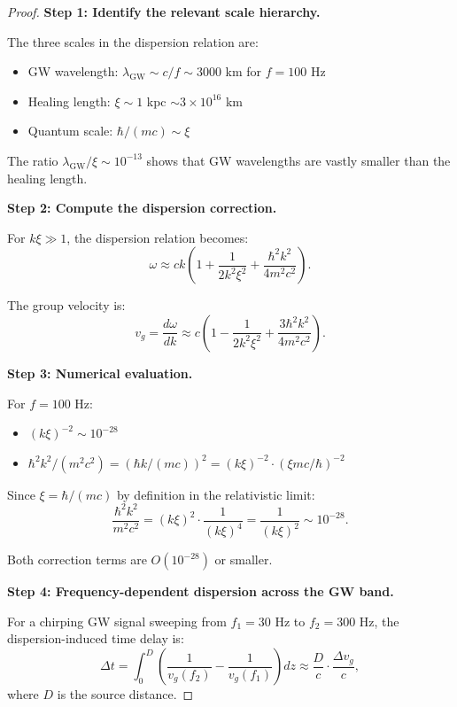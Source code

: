 \documentclass[11pt,a4paper]{article}
\theoremstyle{definition}
\theoremstyle{remark}
\begin{document}
\begin{proof}
\textbf{Step 1: Identify the relevant scale hierarchy.}

The three scales in the dispersion relation are:
\begin{itemize}
\item GW wavelength: $\lambda_{\mathrm{GW}} \sim c/f \sim 3000$ km for $f = 100$ Hz
\item Healing length: $\xi \sim 1$ kpc $\sim 3 \times 10^{16}$ km
\item Quantum scale: $\hbar/(mc) \sim \xi$
\end{itemize}

The ratio $\lambda_{\mathrm{GW}}/\xi \sim 10^{-13}$ shows that GW wavelengths are vastly smaller than the healing length.

\textbf{Step 2: Compute the dispersion correction.}

For $k\xi \gg 1$, the dispersion relation becomes:
\begin{equation}
\omega \approx ck\left(1 + \frac{1}{2k^2\xi^2} + \frac{\hbar^2 k^2}{4m^2 c^2}\right).
\end{equation}

The group velocity is:
\begin{equation}
v_g = \frac{d\omega}{dk} \approx c\left(1 - \frac{1}{2k^2\xi^2} + \frac{3\hbar^2 k^2}{4m^2 c^2}\right).
\end{equation}

\textbf{Step 3: Numerical evaluation.}

For $f = 100$ Hz:
\begin{itemize}
\item $(k\xi)^{-2} \sim 10^{-28}$
\item $\hbar^2 k^2/(m^2 c^2) = (\hbar k/(mc))^2 = (k\xi)^{-2} \cdot (\xi m c/\hbar)^{-2}$
\end{itemize}

Since $\xi = \hbar/(mc)$ by definition in the relativistic limit:
\begin{equation}
\frac{\hbar^2 k^2}{m^2 c^2} = (k\xi)^2 \cdot \frac{1}{(k\xi)^4} = \frac{1}{(k\xi)^2} \sim 10^{-28}.
\end{equation}

Both correction terms are $O(10^{-28})$ or smaller.

\textbf{Step 4: Frequency-dependent dispersion across the GW band.}

For a chirping GW signal sweeping from $f_1 = 30$ Hz to $f_2 = 300$ Hz, the dispersion-induced time delay is:
\begin{equation}
\Delta t = \int_0^D \left(\frac{1}{v_g(f_2)} - \frac{1}{v_g(f_1)}\right)dz \approx \frac{D}{c}\cdot\frac{\Delta v_g}{c},
\end{equation}
where $D$ is the source distance.


\end{proof}
\end{document}
